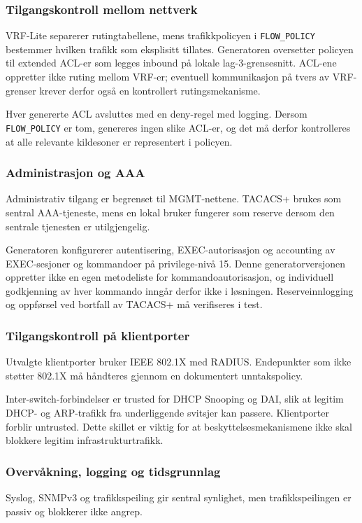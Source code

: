 \subsubsection{Tilgangskontroll mellom nettverk}
VRF-Lite separerer rutingtabellene, mens trafikkpolicyen i \texttt{FLOW\_POLICY} bestemmer hvilken trafikk som eksplisitt tillates. Generatoren oversetter policyen til extended ACL-er som legges inbound på lokale lag-3-grensesnitt. ACL-ene oppretter ikke ruting mellom VRF-er; eventuell kommunikasjon på tvers av VRF-grenser krever derfor også en kontrollert rutingsmekanisme.

Hver genererte ACL avsluttes med en deny-regel med logging. Dersom \texttt{FLOW\_POLICY} er tom, genereres ingen slike ACL-er, og det må derfor kontrolleres at alle relevante kildesoner er representert i policyen.

\subsubsection{Administrasjon og AAA}
Administrativ tilgang er begrenset til MGMT-nettene. TACACS+ brukes som sentral AAA-tjeneste, mens en lokal bruker fungerer som reserve dersom den sentrale tjenesten er utilgjengelig.

Generatoren konfigurerer autentisering, EXEC-autorisasjon og accounting av EXEC-sesjoner og kommandoer på privilege-nivå 15. Denne generatorversjonen oppretter ikke en egen metodeliste for kommandoautorisasjon, og individuell godkjenning av hver kommando inngår derfor ikke i løsningen. Reserveinnlogging og oppførsel ved bortfall av TACACS+ må verifiseres i test.

\subsubsection{Tilgangskontroll på klientporter}
Utvalgte klientporter bruker IEEE 802.1X med RADIUS. Endepunkter som ikke støtter 802.1X må håndteres gjennom en dokumentert unntakspolicy.

Inter-switch-forbindelser er trusted for DHCP Snooping og DAI, slik at legitim DHCP- og ARP-trafikk fra underliggende svitsjer kan passere. Klientporter forblir untrusted. Dette skillet er viktig for at beskyttelsesmekanismene ikke skal blokkere legitim infrastrukturtrafikk.

\subsubsection{Overvåkning, logging og tidsgrunnlag}
Syslog, SNMPv3 og trafikkspeiling gir sentral synlighet, men trafikkspeilingen er passiv og blokkerer ikke angrep.

